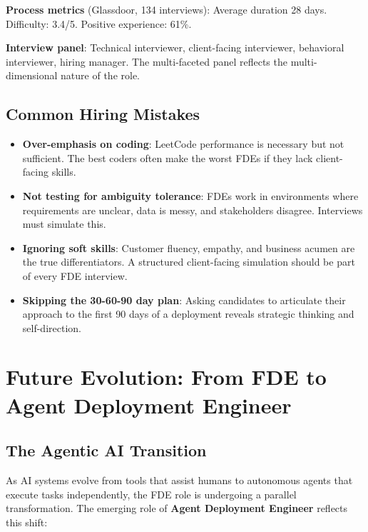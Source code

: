 \vspace{4pt}
\textbf{Process metrics} (Glassdoor, 134 interviews): Average duration
28 days. Difficulty: 3.4/5. Positive experience: 61\%.

\textbf{Interview panel}: Technical interviewer, client-facing
interviewer, behavioral interviewer, hiring manager. The multi-faceted
panel reflects the multi-dimensional nature of the role.

\subsection{Common Hiring Mistakes}

\begin{itemize}
    \item \textbf{Over-emphasis on coding}: LeetCode performance is
        necessary but not sufficient. The best coders often make the
        worst FDEs if they lack client-facing skills.
    \item \textbf{Not testing for ambiguity tolerance}: FDEs work in
        environments where requirements are unclear, data is messy, and
        stakeholders disagree. Interviews must simulate this.
    \item \textbf{Ignoring soft skills}: Customer fluency, empathy, and
        business acumen are the true differentiators. A structured
        client-facing simulation should be part of every FDE interview.
    \item \textbf{Skipping the 30-60-90 day plan}: Asking candidates to
        articulate their approach to the first 90 days of a deployment
        reveals strategic thinking and self-direction.
\end{itemize}

\section{Future Evolution: From FDE to Agent Deployment Engineer}

\subsection{The Agentic AI Transition}

As AI systems evolve from tools that assist humans to autonomous agents
that execute tasks independently, the FDE role is undergoing a parallel
transformation. The emerging role of \textbf{Agent Deployment Engineer}
reflects this shift:

